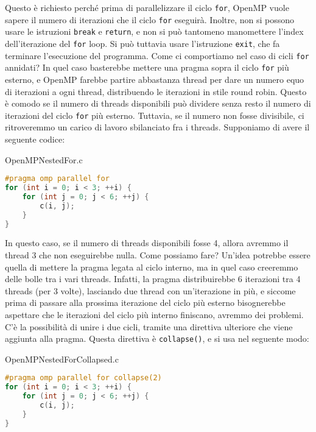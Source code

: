 
Questo è richiesto perché prima di parallelizzare il ciclo \verb|for|, OpenMP vuole sapere il numero di iterazioni che il ciclo \verb|for| eseguirà. Inoltre, non si possono usare le istruzioni \verb|break| e \verb|return|, e non si può tantomeno manomettere l'index dell'iterazione del \verb|for| loop. Si può tuttavia usare l'istruzione \verb|exit|, che fa terminare l'esecuzione del programma.
\nl
Come ci comportiamo nel caso di cicli \verb|for| annidati? In quel caso basterebbe mettere una pragma sopra il ciclo \verb|for| più esterno, e OpenMP farebbe partire abbastanza thread per dare un numero equo di iterazioni a ogni thread, distribuendo le iterazioni in stile round robin. Questo è comodo se il numero di threads disponibili può dividere senza resto il numero di iterazioni del ciclo \verb|for| più esterno. Tuttavia, se il numero non fosse divisibile, ci ritroveremmo un carico di lavoro sbilanciato fra i threads. Supponiamo di avere il seguente codice:

\begin{codeblock}{OpenMPNestedFor.c}
    \begin{lstlisting}[language = C]
#pragma omp parallel for
for (int i = 0; i < 3; ++i) {
    for (int j = 0; j < 6; ++j) {
        c(i, j);
    }
}\end{lstlisting}
\end{codeblock}

In questo caso, se il numero di threads disponibili fosse 4, allora avremmo il thread 3 che non eseguirebbe nulla. Come possiamo fare? Un'idea potrebbe essere quella di mettere la pragma legata al ciclo interno, ma in quel caso creeremmo delle bolle tra i vari threads. Infatti, la pragma distribuirebbe 6 iterazioni tra 4 threads (per 3 volte), lasciando due thread con un'iterazione in più, e siccome prima di passare alla prossima iterazione del ciclo più esterno bisognerebbe aspettare che le iterazioni del ciclo più interno finiscano, avremmo dei problemi.
\nl
C'è la possibilità di unire i due cicli, tramite una direttiva ulteriore che viene aggiunta alla pragma. Questa direttiva è \verb|collapse()|, e si usa nel seguente modo:

\begin{codeblock}{OpenMPNestedForCollapsed.c}
    \begin{lstlisting}[language = C]
#pragma omp parallel for collapse(2)
for (int i = 0; i < 3; ++i) {
    for (int j = 0; j < 6; ++j) {
        c(i, j);
    }
}\end{lstlisting}
\end{codeblock}

